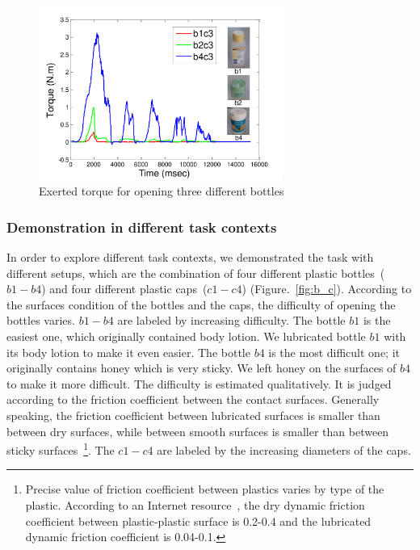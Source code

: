 \begin{figure}
  \centering
  \includegraphics[width=8cm]{./fig/b1b2b4_time_T.pdf}
  \caption{ \scriptsize{Exerted torque for opening three different bottles}
}
\label{fig:bottlepatterns}
\end{figure}


\subsubsection{Demonstration in different task contexts}
\label{sec:exp_context}
In order to explore
different task contexts, we demonstrated the task with different
setups, which are the combination of four different plastic
bottles~($b1-b4$) and four different plastic caps~($c1-c4$)
(Figure.~\ref{fig:b_c}). According to the surfaces condition of the
bottles and the caps, the difficulty of opening the bottles
varies. $b1-b4$ are labeled by increasing difficulty. The bottle $b1$
is the easiest one, which originally contained body lotion. We
lubricated bottle $b1$ with its body lotion to make it even easier. The
bottle $b4$ is the most difficult one; it originally contains honey
which is very sticky. We left honey on the surfaces of $b4$ to make
it more difficult. The difficulty is estimated qualitatively. It is
judged according to the friction coefficient between the contact
surfaces. Generally speaking, the friction coefficient between
lubricated surfaces is smaller than between dry surfaces, while
between smooth surfaces is smaller than between sticky
surfaces~\footnote{Precise value of friction coefficient between
  plastics varies by type of the plastic. According to an Internet
  resource~\citep{FOC}, the dry dynamic friction coefficient between
  plastic-plastic surface is 0.2-0.4 and the lubricated dynamic
  friction coefficient is 0.04-0.1.}. The $c1-c4$ are labeled by the increasing diameters of the caps.


